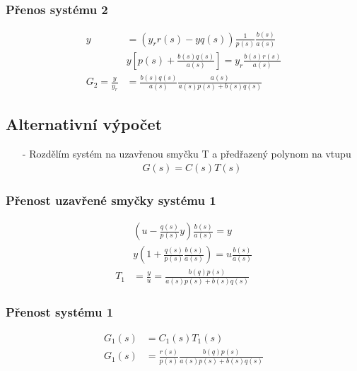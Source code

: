 \documentclass{article}
\begin{document}
\subsubsection{Přenos systému 2}
\begin{align*}
    y &= (y_rr(s)-yq(s))\frac{1}{p(s)}\frac{b(s)}{a(s)}\\
    & y[p(s)+\frac{b(s)q(s)}{a(s)}] = y_r \frac{b(s)r(s)}{a(s)}\\
    G_2 = \frac{y}{y_r} &= \frac{b(s)q(s)}{a(s)}\frac{a(s)}{a(s)p(s)+b(s)q(s)}
\end{align*}

\subsection{Alternativní výpočet}
\begin{itemize} 
    \item[-] Rozdělím systém na uzavřenou smyčku T a předřazený polynom na vtupu
    \begin{align*}
        G(s) = C(s)T(s)
    \end{align*}
\end{itemize}

\subsubsection{Přenost uzavřené smyčky systému 1}
\begin{align*}
    & (u-\frac{q(s)}{p(s)}y)\frac{b(s)}{a(s)} = y\\
    & y(1+\frac{q(s)}{p(s)}\frac{b(s)}{a(s)}) = u\frac{b(s)}{a(s)}\\
    T_1 &= \frac{y}{u} = \frac{b(q)p(s)}{a(s)p(s)+b(s)q(s)}
\end{align*}

\subsubsection{Přenost systému 1}
\begin{align*}
    G_1(s) &= C_1(s)T_1(s)\\
    G_1(s) &= \frac{r(s)}{p(s)}\frac{b(q)p(s)}{a(s)p(s)+b(s)q(s)}
\end{align*}
\end{document}
